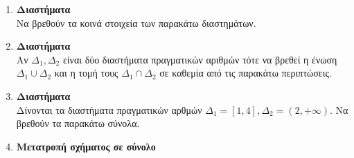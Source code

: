 \documentclass[twoside,nofonts,internet]{askhseis}
\begin{document}
\begin{enumerate}
\vspace{-5mm}
\item \textbf{Διαστήματα}\\
Να βρεθούν τα κοινά στοιχεία των παρακάτω διαστημάτων.
\begin{multicols}{2}
\begin{rlist}
\item $ [2,4]\ ,\ [3,7] $
\item $ (-\infty,5)\ ,\ (-3,7) $
\item $ [0,3)\ ,\ (1,3] $
\item $ (-\infty,4)\ ,\ [5,+\infty) $
\item $ (-3,4]\ ,\ (-\infty,4) $
\item $ [2,+\infty)\ ,\ (3,+\infty) $
\end{rlist}
\end{multicols}
\item \textbf{Διαστήματα}\\
Αν $ \varDelta_1,\varDelta_2 $ είναι δύο διαστήματα πραγματικών αριθμών τότε να βρεθεί η ένωση $ \varDelta_1\cup\varDelta_2 $ και η τομή τους $ \varDelta_1\cap\varDelta_2 $ σε καθεμία από τις παρακάτω περιπτώσεις.
\begin{rlist}
\item $ \varDelta_1=[-3,3] $ και $ \varDelta_2=(-2,4] $.
\item $ \varDelta_1=[1,4) $ και $ \varDelta_2=(0,+\infty) $.
\item $ \varDelta_1=(-4,0) $ και $ \varDelta_2=(-\infty,-2] $.
\item $ \varDelta_1=(-\infty,10) $ και $ \varDelta_2=(11,+\infty) $.
\end{rlist}
\item \textbf{Διαστήματα}\\
Δίνονται τα διαστήματα πραγματικών αρθμών $ \varDelta_1=[1,4],\varDelta_2=(2,+\infty) $. Να βρεθούν τα παρακάτω σύνολα.
\begin{multicols}{3}
\end{multicols}
\item \textbf{Μετατροπή σχήματος σε σύνολο}\\

\end{enumerate}
\end{document}
